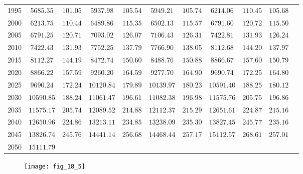 \documentclass[../main.tex]{subfiles}
\begin{document}
\begin{enumerate}[label=\bfseries(\alph*)]
\begin{tabular}{ccccccccccc}
1995 & $5685.35$ & $101.05$ & $5937.98$ & $105.54$ & $5949.21$ & $105.74$ & $6214.06$ & $110.45$ & $105.68$ \\
2000 & $6213.75$ & $110.44$ & $6489.86$ & $115.35$ & $6502.13$ & $115.57$ & $6791.60$ & $120.72$ & $115.50$ \\
2005 & $6791.25$ & $120.71$ & $7093.02$ & $126.07$ & $7106.43$ & $126.31$ & $7422.81$ & $131.93$ & $126.24$ \\
2010 & $7422.43$ & $131.93$ & $7752.25$ & $137.79$ & $7766.90$ & $138.05$ & $8112.68$ & $144.20$ & $137.97$ \\
2015 & $8112.27$ & $144.19$ & $8472.74$ & $150.60$ & $8488.76$ & $150.88$ & $8866.67$ & $157.60$ & $150.79$ \\
2020 & $8866.22$ & $157.59$ & $9260.20$ & $164.59$ & $9277.70$ & $164.90$ & $9690.74$ & $172.25$ & $164.80$ \\
2025 & $9690.24$ & $172.24$ & $10120.84$ & $179.89$ & $10139.97$ & $180.23$ & $10591.40$ & $188.25$ & $180.12$ \\
2030 & $10590.85$ & $188.24$ & $11061.47$ & $196.61$ & $11082.38$ & $196.98$ & $11575.76$ & $205.75$ & $196.86$ \\
2035 & $11575.17$ & $205.74$ & $12089.52$ & $214.88$ & $12112.37$ & $215.29$ & $12651.61$ & $224.87$ & $215.16$ \\
2040 & $12650.96$ & $224.86$ & $13213.11$ & $234.85$ & $13238.09$ & $235.30$ & $13827.45$ & $245.77$ & $235.16$ \\
2045 & $13826.74$ & $245.76$ & $14441.14$ & $256.68$ & $14468.44$ & $257.17$ & $15112.57$ & $268.61$ & $257.01$ \\
2050 & $15111.79$ &  &  &  &  &  &  &  &  \\
\hline
\end{tabular}
	\bigbreak
	\begin{figure}[H]
		\texttt{[image: fig\_18\_5]}
		\label{fig:fig_18_5}
	\end{figure}
	\bigbreak
\end{enumerate}
\end{document}
